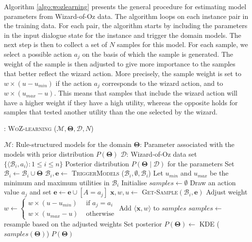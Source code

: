Algorithm \ref{algo:wozlearning} presents the general procedure for estimating model parameters from Wizard-of-Oz data.  The algorithm loops on each instance pair in the training data.  For each pair, the algorithm starts by including the parameters in the input dialogue state for the 
instance and trigger the domain models.  The next step is then to collect a set of $N$ samples for this model.  For each sample, we select a possible action $a_j$ on the basis of which the sample is generated. The weight of the sample is then adjusted to give more importance to the samples that better reflect the wizard action.  More precisely, the sample weight is set to $w \times (u-u_{min})$ if the action $a_j$ corresponds to the wizard action, and to $w \times (u_{max}-u)$.  This means that samples that include the wizard action will have a higher weight if they have a high utility, whereas the opposite holds for samples that tested another utility than the one selected by the wizard. 

\begin{algorithm}[h!]
\caption{: \textsc{WoZ-learning} ($\mathcal{M}, \boldsymbol\Theta, \mathcal{D}, N$)}
\begin{algorithmic}[1] \vspace{1mm}
\REQUIRE $\mathcal{M}$: Rule-structured models for the domain
\REQUIRE $\boldsymbol\Theta$: Parameter associated with the models with prior distribution $P(\boldsymbol\Theta)$
\REQUIRE $\mathcal{D}$: Wizard-of-Oz data set $\{\langle \mathcal{B}_i, a_i \rangle : 1 \leq i  \leq n\}$
\ENSURE Posterior distribution $P(\boldsymbol\Theta \; | \; \mathcal{D})$ for the parameters  \vspace{1mm}
\STATE Set $\mathcal{B}_i \leftarrow \mathcal{B}_i \cup \boldsymbol\Theta$
\STATE $\mathcal{B}_i, \mathbf{e} \leftarrow$ \textsc{TriggerModels} ($\mathcal{B}_i, \emptyset,  \mathcal{B}_i$) 
\STATE Let $u_{min}$ and $u_{max}$ be the minimum and maximum utilities in $\mathcal{B}_i$
\STATE Initialise $\mathit{samples} \leftarrow \emptyset$
\STATE Draw an action value $a_j$ and set $\mathbf{e} \leftarrow \mathbf{e} \cup [A=a_j]$
\STATE $\mathbf{x}, w, u \leftarrow $ \textsc{Get-Sample}$(\mathcal{B}_i, \mathbf{e})$ 
\STATE Adjust weight $w \leftarrow \begin{cases} w \times (u-u_{min}) & \text{ if } a_j=a_i \\ w \times (u_{max}-u) & \text{ otherwise} \end{cases}$
\STATE Add $\langle \mathbf{x}, w \rangle$ to $\mathit{samples}$
\ENDFOR
\STATE $\mathit{samples} \leftarrow $ resample based on the adjusted weights
\STATE Set posterior $P(\boldsymbol\Theta) \leftarrow $ KDE ($\mathit{samples}(\boldsymbol\Theta)$)
\ENDFOR
\RETURN $P(\boldsymbol\Theta)$
\end{algorithmic}
\label{algo:wozlearning}
\end{algorithm}

